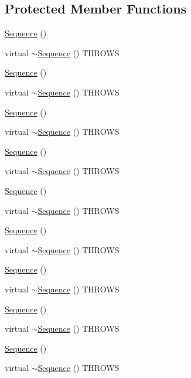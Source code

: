 \subsection*{Protected Member Functions}
\begin{DoxyCompactItemize}
\item 
\mbox{\hyperlink{classfakeit_1_1Sequence_a5b5a2c82e744f45eb7bf7708271ccf4a}{Sequence}} ()
\item 
virtual \mbox{\hyperlink{classfakeit_1_1Sequence_a2b4084b5c81830f6784f3f04382c9c2c}{$\sim$\+Sequence}} () T\+H\+R\+O\+WS
\item 
\mbox{\hyperlink{classfakeit_1_1Sequence_a5b5a2c82e744f45eb7bf7708271ccf4a}{Sequence}} ()
\item 
virtual \mbox{\hyperlink{classfakeit_1_1Sequence_a2b4084b5c81830f6784f3f04382c9c2c}{$\sim$\+Sequence}} () T\+H\+R\+O\+WS
\item 
\mbox{\hyperlink{classfakeit_1_1Sequence_a5b5a2c82e744f45eb7bf7708271ccf4a}{Sequence}} ()
\item 
virtual \mbox{\hyperlink{classfakeit_1_1Sequence_a2b4084b5c81830f6784f3f04382c9c2c}{$\sim$\+Sequence}} () T\+H\+R\+O\+WS
\item 
\mbox{\hyperlink{classfakeit_1_1Sequence_a5b5a2c82e744f45eb7bf7708271ccf4a}{Sequence}} ()
\item 
virtual \mbox{\hyperlink{classfakeit_1_1Sequence_a2b4084b5c81830f6784f3f04382c9c2c}{$\sim$\+Sequence}} () T\+H\+R\+O\+WS
\item 
\mbox{\hyperlink{classfakeit_1_1Sequence_a5b5a2c82e744f45eb7bf7708271ccf4a}{Sequence}} ()
\item 
virtual \mbox{\hyperlink{classfakeit_1_1Sequence_a2b4084b5c81830f6784f3f04382c9c2c}{$\sim$\+Sequence}} () T\+H\+R\+O\+WS
\item 
\mbox{\hyperlink{classfakeit_1_1Sequence_a5b5a2c82e744f45eb7bf7708271ccf4a}{Sequence}} ()
\item 
virtual \mbox{\hyperlink{classfakeit_1_1Sequence_a2b4084b5c81830f6784f3f04382c9c2c}{$\sim$\+Sequence}} () T\+H\+R\+O\+WS
\item 
\mbox{\hyperlink{classfakeit_1_1Sequence_a5b5a2c82e744f45eb7bf7708271ccf4a}{Sequence}} ()
\item 
virtual \mbox{\hyperlink{classfakeit_1_1Sequence_a2b4084b5c81830f6784f3f04382c9c2c}{$\sim$\+Sequence}} () T\+H\+R\+O\+WS
\item 
\mbox{\hyperlink{classfakeit_1_1Sequence_a5b5a2c82e744f45eb7bf7708271ccf4a}{Sequence}} ()
\item 
virtual \mbox{\hyperlink{classfakeit_1_1Sequence_a2b4084b5c81830f6784f3f04382c9c2c}{$\sim$\+Sequence}} () T\+H\+R\+O\+WS
\item 
\mbox{\hyperlink{classfakeit_1_1Sequence_a5b5a2c82e744f45eb7bf7708271ccf4a}{Sequence}} ()
\item 
virtual \mbox{\hyperlink{classfakeit_1_1Sequence_a2b4084b5c81830f6784f3f04382c9c2c}{$\sim$\+Sequence}} () T\+H\+R\+O\+WS
\end{DoxyCompactItemize}
